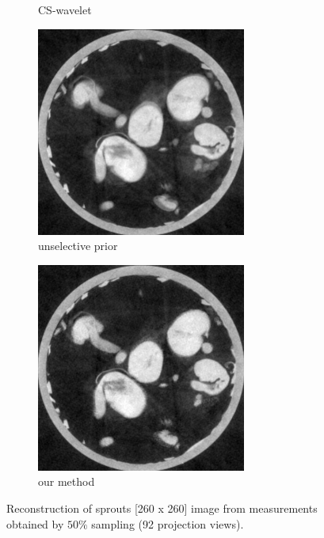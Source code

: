 \documentclass{article}
\begin{document}
\begin{figure}[h]
\begin{subfigure}[b]{0.3\linewidth}
        \caption{CS-wavelet}
     \end{subfigure}
\quad
    \begin{subfigure}[b]{0.3\linewidth}
        \includegraphics[width=\textwidth]{../images/supplementary/2D_sprouts/92_angles/1/plain_pca.png}
        \caption{unselective prior}
     \end{subfigure}
\quad
    \begin{subfigure}[b]{0.3\linewidth}
        \includegraphics[width=\textwidth]{../images/supplementary/2D_sprouts/92_angles/1/weighted_pca5.png}
        \caption{our method}
     \end{subfigure}
     \caption{Reconstruction of sprouts [260 x 260] image from measurements obtained by $50\%$ sampling (92 projection views).} 
\label{fig:joint}
\end{figure}
\end{document}
